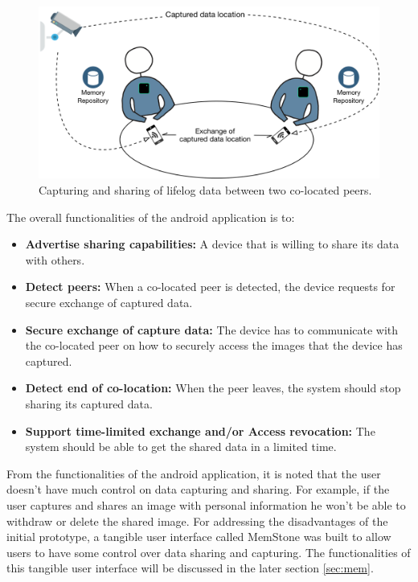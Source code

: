 \documentclass[mscthesis]{usiinfthesis}
\begin{document}
\begin{figure}[!ht]
  \centering
  \includegraphics[width=1\textwidth]{System}
  \caption{Capturing and sharing of lifelog data between two co-located peers.}
  \label{fig2}
\end{figure}

The overall functionalities of the android application is to:
\begin{itemize}
  \item \textbf{Advertise sharing capabilities:} A device that is willing to share its data with others.
  \item \textbf{Detect peers:} When a co-located peer is detected, the device requests for secure exchange of captured data.
  \item \textbf{Secure exchange of capture data:} The device has to communicate with the co-located peer on how to securely access the images that the device has captured.
  \item \textbf{Detect end of co-location:} When the peer leaves, the system should stop sharing its captured data.
\item \textbf{Support time-limited exchange and/or Access revocation:} The system should be able to get the shared data in a limited time. 
\end{itemize}
 
From the functionalities of the android application, it is noted that the user doesn’t have much control on data capturing and sharing. For example, if the user captures and shares an image with personal information he won’t be able to withdraw or delete the shared image. For addressing the disadvantages of the initial prototype, a tangible user interface called MemStone was built to allow users to have some control over data sharing and capturing. The functionalities of this tangible user interface will be discussed in the later section \ref{sec:mem}.
\end{document}

